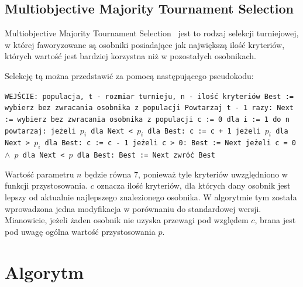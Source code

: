 \documentclass[brudnopis]{xmgr}
\begin{document}
\subsection{Multiobjective Majority Tournament Selection}

Multiobjective Majority Tournament Selection~\cite{Luke2009Metaheuristics} jest to rodzaj selekcji turniejowej, w której faworyzowane są osobniki posiadające jak największą ilość kryteriów, których wartość jest bardziej korzystna niż w pozostałych osobnikach.

Selekcję tą można przedstawić za pomocą następującego pseudokodu:\newline

\noindent
\texttt{WEJŚCIE: populacja, t - rozmiar turnieju, n - ilość kryteriów\newline
Best := wybierz bez zwracania osobnika z populacji\newline
Powtarzaj t - 1 razy:\newline
\indent Next := wybierz bez zwracania osobnika z populacji\newline
\indent c := 0\newline
\indent dla i := 1 do n powtarzaj:\newline
\indent\indent jeżeli $p_i$ dla Next < $p_i$ dla Best:\newline
\indent\indent\indent c := c + 1\newline
\indent\indent jeżeli $p_i$ dla Next > $p_i$ dla Best:\newline
\indent\indent\indent c := c - 1\newline
\indent jeżeli c > 0:\newline
\indent\indent Best := Next\newline
\indent jeżeli c = 0 $\wedge$ $p$ dla Next < $p$ dla Best:\newline
\indent\indent Best := Next\newline
zwróć Best\newline
}

Wartość parametru $n$ będzie równa 7, ponieważ tyle kryteriów uwzględniono w funkcji przystosowania. $c$ oznacza ilość kryteriów, dla których dany osobnik jest lepszy od aktualnie najlepszego znalezionego osobnika. W algorytmie tym została wprowadzona jedna modyfikacja w porównaniu do standardowej wersji. Mianowicie, jeżeli żaden osobnik nie uzyska przewagi pod względem $c$, brana jest pod uwagę ogólna wartość przystosowania $p$.


\section{Algorytm}
\end{document}

